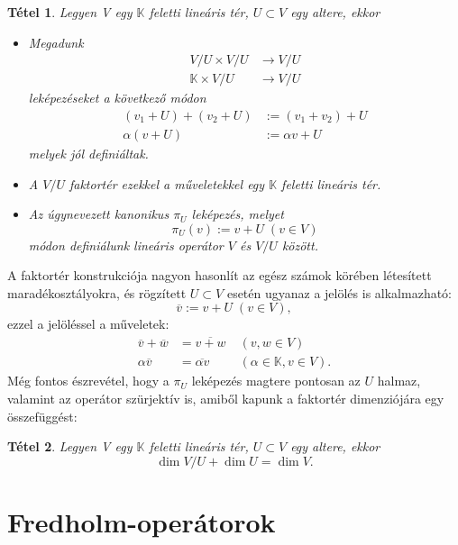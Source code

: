 \documentclass[oneside, titlepage, 12pt, a4paper]{report}
\newtheorem{theorem}{Tétel}[section]
\begin{document}
\begin{theorem}
Legyen V egy $\mathbb{K}$ feletti lineáris tér, $U \subset V$ egy altere, ekkor
\begin{itemize}
\item
Megadunk	%
\begin{align*}
V / U \times V / U & \longrightarrow V / U \\
\mathbb{K} \times V / U & \longrightarrow V / U
\end{align*}
leképezéseket a következő módon
\begin{align}
(v_1 + U) + (v_2 + U) &:= (v_1 + v_2) + U \\
\alpha (v + U) &:= \alpha v + U
\end{align}
melyek jól definiáltak.
\item
A $V / U$ faktortér ezekkel a műveletekkel egy $\mathbb{K}$ feletti lineáris tér.
\item %
Az úgynevezett kanonikus $\pi_U$ leképezés, melyet
\begin{equation*}
\pi_U(v) := v + U \; (v \in V)
\end{equation*}
módon definiálunk lineáris operátor $V$ és $V / U$ között.
\end{itemize}
\end{theorem}
A faktortér konstrukciója nagyon hasonlít az egész számok körében létesített maradékosztályokra, és rögzített $U \subset V$ esetén ugyanaz a jelölés is alkalmazható:
\begin{equation*}
\overline{v} := v + U \; (v \in V),
\end{equation*}
ezzel a jelöléssel a műveletek:
\begin{align*}
\overline{v} + \overline{w} &= \overline{v + w} \; &(v, w \in V) \\
\alpha \overline{v} &= \overline{\alpha v} \; &(\alpha \in \mathbb{K}, v \in V).
\end{align*}
Még fontos észrevétel, hogy a $\pi_U$ leképezés magtere pontosan az $U$ halmaz, valamint az operátor szürjektív is, amiből kapunk a faktortér dimenziójára egy összefüggést:
\begin{theorem}
Legyen V egy $\mathbb{K}$ feletti lineáris tér, $U \subset V$ egy altere, ekkor
\begin{equation}
\dim V / U + \dim U = \dim V.
\end{equation}
\end{theorem}


\section{Fredholm-operátorok}
\label{sec:Fredholm}

 

 
\end{document}
